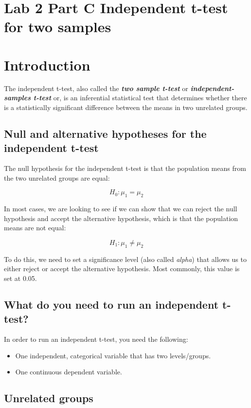 \documentclass[]{article}
\begin{document}
\section*{Lab 2 Part C Independent t-test for two samples}

\section{Introduction}
The independent t-test, also called the \textbf{\textit{two sample t-test}} or  \textbf{\textit{independent-samples t-test}} or, is an inferential statistical test that determines whether there is a statistically significant difference between the means in two unrelated groups.

\subsection{Null and alternative hypotheses for the independent t-test}
The null hypothesis for the independent t-test is that the population means from the two unrelated groups are equal:

\[H_0: \mu_1 = \mu_2\]

\noindent In most cases, we are looking to see if we can show that we can reject the null hypothesis and accept the alternative hypothesis, which is that the population means are not equal:

\[H_1: \mu_1 \neq \mu_2\]

\noindent To do this, we need to set a significance level (also called \textit{alpha}) that allows us to either reject or accept the alternative hypothesis. Most commonly, this value is set at 0.05.

\subsection{What do you need to run an independent t-test?}
In order to run an independent t-test, you need the following:
\begin{itemize}
	\item One independent, categorical variable that has two levels/groups.
	\item One continuous dependent variable.
\end{itemize}


\subsection{Unrelated groups}
\end{document}
